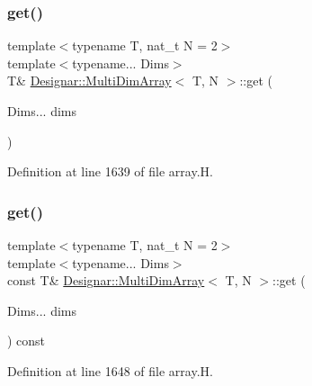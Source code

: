 \subsubsection{\texorpdfstring{get()}{get()}\hspace{0.1cm}{\footnotesize\ttfamily [1/2]}}
{\footnotesize\ttfamily template$<$typename T, nat\+\_\+t N = 2$>$ \\
template$<$typename... Dims$>$ \\
T\& \hyperlink{class_designar_1_1_multi_dim_array}{Designar\+::\+Multi\+Dim\+Array}$<$ T, N $>$\+::get (\begin{DoxyParamCaption}\item[{Dims...}]{dims }\end{DoxyParamCaption})\hspace{0.3cm}{\ttfamily [inline]}}



Definition at line 1639 of file array.\+H.

\mbox{\label{class_designar_1_1_multi_dim_array_a36ba716b359942501b9cd6d96562e774}} 
\subsubsection{\texorpdfstring{get()}{get()}\hspace{0.1cm}{\footnotesize\ttfamily [2/2]}}
{\footnotesize\ttfamily template$<$typename T, nat\+\_\+t N = 2$>$ \\
template$<$typename... Dims$>$ \\
const T\& \hyperlink{class_designar_1_1_multi_dim_array}{Designar\+::\+Multi\+Dim\+Array}$<$ T, N $>$\+::get (\begin{DoxyParamCaption}\item[{Dims...}]{dims }\end{DoxyParamCaption}) const\hspace{0.3cm}{\ttfamily [inline]}}



Definition at line 1648 of file array.\+H.

\mbox{\label{class_designar_1_1_multi_dim_array_a9547e76013b4f532de026ec425ad4f7a}} 
